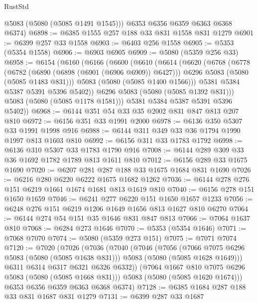 \begin{lexlean}{RustStd}
\begin{coremodule}
        @5083
        (@5080 (@5085 @1491 @1545)))
      @6353
      @6356
      @6359
      @6363
      @6368
      @6374)
@6898 := @6385 @1555 @257 @188 @33 @831 @1558 @831 @1279
@6901 := @6399 @257 @33 @1558
@6903 := @6403 @256 @1558
@6905 := @5353 (@5354 @1558)
@6906 := @6903 @6905
@6909 := @5080 (@5359 @256 @33)
@6958 := @6154
    (@6160
      (@6166
        (@6600
          (@6610
            (@6614
              (@6620
                (@6768
                  (@6778
                    (@6782 (@6890 (@6898 (@6901 (@6906 @6909)) @6427)))
                    @6296
                    @5083
                    (@5080 (@5085 @1483 @831)))
                  @5083
                  (@5080 (@5085 @1400 @1566)))
                @5381
                @5384
                @5387
                @5391
                @5396
                @5402))
            @6296
            @5083
            (@5080 (@5085 @1392 @831)))
          @5083
          (@5080 (@5085 @1178 @1581)))
        @5381
        @5384
        @5387
        @5391
        @5396
        @5402))
@6968 := @6144 @351 @54 @33 @35 @2002 @831 @847 @813 @207 @810
@6972 := @6156 @351 @33 @1991 @2000
@6978 := @6136 @350 @5307 @33 @1991 @1998 @916
@6988 := @6144 @311 @349 @33 @36 @1794 @1990 @1997 @813 @1603 @810
@6992 := @6156 @311 @33 @1783 @1792
@6998 := @6136 @310 @5307 @33 @1783 @1790 @916
@7008 := @6144 @289 @309 @33 @36 @1692 @1782 @1789 @813 @1611 @810
@7012 := @6156 @289 @33 @1675 @1690
@7020 := @6207 @281 @287 @188 @33 @1675 @1684 @831 @1690
@7026 := @6216 @280 @6220 @6222 @1675 @1682 @1262
@7036 := @6144 @278 @276 @151 @6219 @1661 @1674 @1681 @813 @1619 @810
@7040 := @6156 @278 @151 @1650 @1659
@7046 := @6241 @277 @6220 @151 @1650 @1657 @1233
@7056 := @6248 @276 @151 @6219 @1206 @1649 @1656 @813 @1627 @810 @6270
@7064 := @6144 @274 @54 @151 @35 @1646 @831 @847 @813
@7066 := @7064 @1637 @810
@7068 := @6284 @273 @1646
@7070 := @5353 (@5354 @1646)
@7071 := @7068 @7070
@7074 := @5080 (@5359 @273 @151)
@7075 := @7071 @7074
@7120 := @7020
    (@7026
      (@7036
        (@7040
          (@7046
            (@7056
              (@7066 @7075 @6296 @5083 (@5080 (@5085 @1638 @831)))
              @5083
              (@5080 (@5085 @1628 @1649)))
            @6311
            @6314
            @6317
            @6321
            @6326
            @6332))
        (@7064 @1667 @810 @7075 @6296 @5083 (@5080 (@5085 @1668 @831)))
        @5083
        (@5080 (@5085 @1620 @1674)))
      @6353
      @6356
      @6359
      @6363
      @6368
      @6374)
@7128 := @6385 @1684 @287 @188 @33 @831 @1687 @831 @1279
@7131 := @6399 @287 @33 @1687

\end{coremodule}
\end{lexlean}
